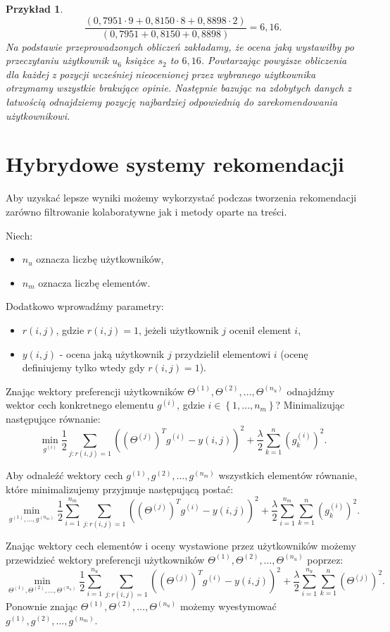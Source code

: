 \documentclass[12pt,a4paper]{report}
\newtheorem{przyklad}{Przykład}[chapter]
\newcommand{\set}[1]{\left\lbrace {#1} \right\rbrace}
\begin{document}
\begin{przyklad}
$$
\frac{(0,7951 \cdot 9 + 0,8150 \cdot 8 + 0,8898 \cdot 2)}{(0,7951 + 0,8150 + 0,8898)} = 6,16.
$$
Na podstawie przeprowadzonych obliczeń zakładamy, że ocena jaką wystawiłby po przeczytaniu użytkownik $u_6$ książce $s_2$ to $6,16$.
Powtarzając powyższe obliczenia dla każdej z pozycji wcześniej nieocenionej przez wybranego użytkownika otrzymamy wszystkie brakujące opinie. Następnie bazując na zdobytych danych z łatwością odnajdziemy pozycję najbardziej odpowiednią do zarekomendowania użytkownikowi.
\end{przyklad}
\section{Hybrydowe systemy rekomendacji}
Aby uzyskać lepsze wyniki możemy wykorzystać podczas tworzenia rekomendacji zarówno filtrowanie kolaboratywne jak i metody oparte na treści.
\bigskip
\bigskip

Niech:
\begin{itemize}
\item $n_u$ oznacza liczbę użytkowników,
\item $n_m$ oznacza liczbę elementów.
\end{itemize}
Dodatkowo wprowadźmy parametry:
\begin{itemize}
\item $r(i,j)$, gdzie $r(i,j)=1$, jeżeli użytkownik $j$ ocenił element $i$,
\item $y(i,j)$ - ocena jaką użytkownik $j$ przydzielił elementowi $i$ (ocenę definiujemy tylko wtedy gdy $r(i,j)=1$).
\end{itemize}
Znając wektory preferencji użytkowników $\Theta^{(1)}, \Theta^{(2)},\ldots,\Theta^{(n_u)}$ odnajdźmy wektor cech konkretnego elementu $g^{(i)}$, gdzie $i \in \set{1,\ldots,n_m}$?
Minimalizując następujące równanie:
$$
\min \limits_{g^{(i)}} \frac{1}{2} \sum_{j:r(i,j)=1} ((\Theta^{(j)})^T g^{(i)} - y(i,j))^2 + \frac{\lambda}{2} \sum_{k=1}^n (g_k^{(i)})^2.
$$

Aby odnaleźć wektory cech $g^{(1)}, g^{(2)},\ldots,g^{(n_m)}$ wszystkich elementów równanie, które minimalizujemy przyjmuje następującą postać:
$$
\min \limits_{g^{(1)},...,g^{(n_m)}} \frac{1}{2} \sum_{i=1}^{n_m} \sum_{j:r(i,j)=1} ((\Theta^{(j)})^T g^{(i)} - y(i,j))^2 + \frac{\lambda}{2} \sum_{i=1}^{n_m} \sum_{k=1}^n (g_k^{(i)})^2.
$$

Znając wektory cech elementów i oceny wystawione przez użytkowników możemy przewidzieć wektory preferencji użytkowników $\Theta^{(1)}, \Theta^{(2)},\ldots,\Theta^{(n_u)}$ poprzez:
$$
\min \limits_{\Theta^{(1)}, \Theta^{(2)},\ldots,\Theta^{(n_u)}} \frac{1}{2} \sum_{i=1}^{n_u} \sum_{j:r(i,j)=1} ((\Theta^{(j)})^T g^{(i)} - y(i,j))^2 + \frac{\lambda}{2} \sum_{i=1}^{n_u} \sum_{k=1}^n (\Theta^{(j)})^2.
$$
Ponownie znając $\Theta^{(1)}, \Theta^{(2)},\ldots,\Theta^{(n_u)}$ możemy wyestymować $g^{(1)}, g^{(2)},\ldots,g^{(n_m)}$.
\end{document}
